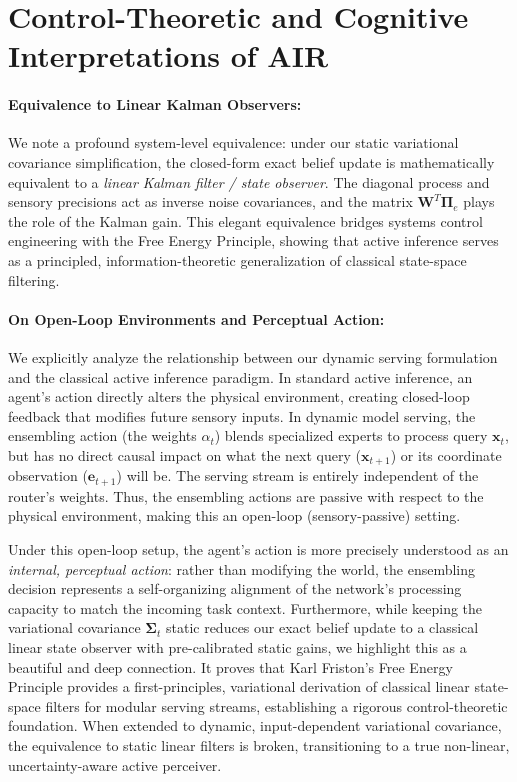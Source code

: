\documentclass{article}
\theoremstyle{plain}
\theoremstyle{definition}
\theoremstyle{remark}
\begin{document}
\section{Control-Theoretic and Cognitive Interpretations of AIR}
\label{app:control_theoretic}

\paragraph{Equivalence to Linear Kalman Observers:}
We note a profound system-level equivalence: under our static variational covariance simplification, the closed-form exact belief update is mathematically equivalent to a \emph{linear Kalman filter / state observer}. The diagonal process and sensory precisions act as inverse noise covariances, and the matrix $\mathbf{W}^T\mathbf{\Pi}_e$ plays the role of the Kalman gain. This elegant equivalence bridges systems control engineering with the Free Energy Principle, showing that active inference serves as a principled, information-theoretic generalization of classical state-space filtering.

\paragraph{On Open-Loop Environments and Perceptual Action:}
We explicitly analyze the relationship between our dynamic serving formulation and the classical active inference paradigm. In standard active inference, an agent's action directly alters the physical environment, creating closed-loop feedback that modifies future sensory inputs. In dynamic model serving, the ensembling action (the weights $\alpha_t$) blends specialized experts to process query $\mathbf{x}_t$, but has no direct causal impact on what the next query ($\mathbf{x}_{t+1}$) or its coordinate observation ($\mathbf{e}_{t+1}$) will be. The serving stream is entirely independent of the router's weights. Thus, the ensembling actions are passive with respect to the physical environment, making this an open-loop (sensory-passive) setting.

Under this open-loop setup, the agent's action is more precisely understood as an \emph{internal, perceptual action}: rather than modifying the world, the ensembling decision represents a self-organizing alignment of the network's processing capacity to match the incoming task context. Furthermore, while keeping the variational covariance $\mathbf{\Sigma}_t$ static reduces our exact belief update to a classical linear state observer with pre-calibrated static gains, we highlight this as a beautiful and deep connection. It proves that Karl Friston's Free Energy Principle provides a first-principles, variational derivation of classical linear state-space filters for modular serving streams, establishing a rigorous control-theoretic foundation. When extended to dynamic, input-dependent variational covariance, the equivalence to static linear filters is broken, transitioning to a true non-linear, uncertainty-aware active perceiver.
\end{document}
